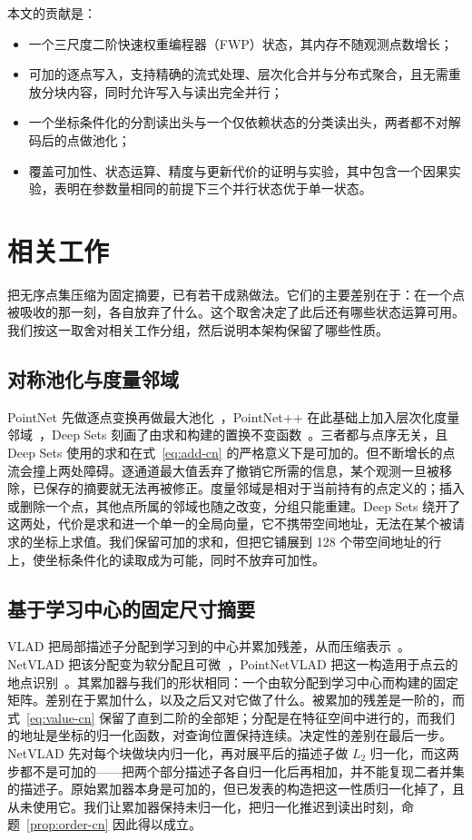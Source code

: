 \documentclass[UTF8,a4paper,11pt,fontset=windows]{ctexart}
\begin{document}
本文的贡献是：
\begin{itemize}
\item 一个三尺度二阶快速权重编程器（FWP）状态，其内存不随观测点数增长；
\item 可加的逐点写入，支持精确的流式处理、层次化合并与分布式聚合，且无需重放分块内容，同时允许写入与读出完全并行；
\item 一个坐标条件化的分割读出头与一个仅依赖状态的分类读出头，两者都不对解码后的点做池化；
\item 覆盖可加性、状态运算、精度与更新代价的证明与实验，其中包含一个因果实验，表明在参数量相同的前提下三个并行状态优于单一状态。
\end{itemize}

\section{相关工作}
把无序点集压缩为固定摘要，已有若干成熟做法。它们的主要差别在于：在一个点被吸收的那一刻，各自放弃了什么。这个取舍决定了此后还有哪些状态运算可用。我们按这一取舍对相关工作分组，然后说明本架构保留了哪些性质。

\subsection{对称池化与度量邻域}
PointNet 先做逐点变换再做最大池化~\cite{qi2017pointnet}，PointNet++ 在此基础上加入层次化度量邻域~\cite{qi2017pointnetplusplus}，Deep Sets 刻画了由求和构建的置换不变函数~\cite{zaheer2017deepsets}。三者都与点序无关，且 Deep Sets 使用的求和在式~\eqref{eq:add-cn} 的严格意义下是可加的。但不断增长的点流会撞上两处障碍。逐通道最大值丢弃了撤销它所需的信息，某个观测一旦被移除，已保存的摘要就无法再被修正。度量邻域是相对于当前持有的点定义的；插入或删除一个点，其他点所属的邻域也随之改变，分组只能重建。Deep Sets 绕开了这两处，代价是求和进一个单一的全局向量，它不携带空间地址，无法在某个被请求的坐标上求值。我们保留可加的求和，但把它铺展到 128 个带空间地址的行上，使坐标条件化的读取成为可能，同时不放弃可加性。

\subsection{基于学习中心的固定尺寸摘要}
VLAD 把局部描述子分配到学习到的中心并累加残差，从而压缩表示~\cite{jegou2010vlad}。NetVLAD 把该分配变为软分配且可微~\cite{arandjelovic2016netvlad}，PointNetVLAD 把这一构造用于点云的地点识别~\cite{uy2018pointnetvlad}。其累加器与我们的形状相同：一个由软分配到学习中心而构建的固定矩阵。差别在于累加什么，以及之后又对它做了什么。被累加的残差是一阶的，而式~\eqref{eq:value-cn} 保留了直到二阶的全部矩；分配是在特征空间中进行的，而我们的地址是坐标的归一化函数，对查询位置保持连续。决定性的差别在最后一步。NetVLAD 先对每个块做块内归一化，再对展平后的描述子做 $L_2$ 归一化，而这两步都不是可加的——把两个部分描述子各自归一化后再相加，并不能复现二者并集的描述子。原始累加器本身是可加的，但已发表的构造把这一性质归一化掉了，且从未使用它。我们让累加器保持未归一化，把归一化推迟到读出时刻，命题~\ref{prop:order-cn} 因此得以成立。
\end{document}
